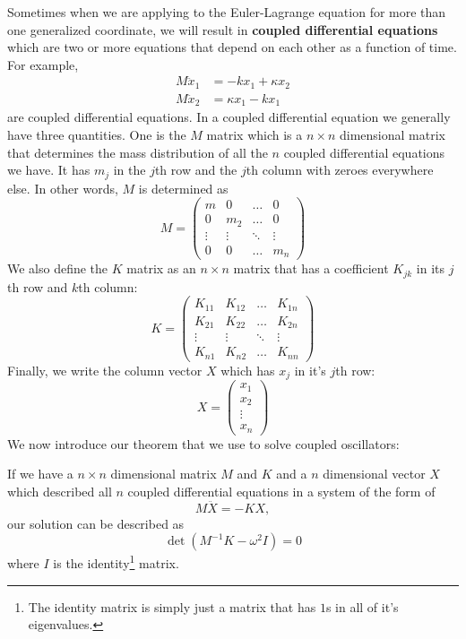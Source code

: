 \documentclass[11pt]{scrartcl}
\begin{document}
Sometimes when we are applying to the Euler-Lagrange equation for more than one generalized coordinate, we will result in \textbf{coupled differential equations} which are two or more equations that depend on each other as a function of time. For example, 
\begin{align*}
    M\ddot{x}_1 &= -kx_1 + \kappa x_2 \\
    M\ddot{x}_2 &= \kappa x_1 - kx_1
\end{align*}
are coupled differential equations. In a coupled differential equation we generally have three quantities. One is the $M$ matrix which is a $n\times n$ dimensional matrix that determines the mass distribution of all the $n$ coupled differential equations we have. It has $m_j$ in the $j$th row and the $j$th column with zeroes everywhere else. In other words, $M$ is determined as 
\[M = \begin{pmatrix}
m & 0 & \dots & 0 \\
0 & m_2 & \dots & 0 \\
\vdots & \vdots & \ddots & \vdots \\
0 & 0 & \dots & m_n
\end{pmatrix}\]
We also define the $K$ matrix as an $n\times n$ matrix that has a coefficient $K_{jk}$ in its $j$th row and $k$th column:
\[K = \begin{pmatrix}
K_{11} & K_{12} & \dots & K_{1n} \\
K_{21} & K_{22} & \dots & K_{2n} \\
\vdots & \vdots & \ddots & \vdots \\
K_{n1} & K_{n2} & \dots & K_{nn}
\end{pmatrix}\]
Finally, we write the column vector $X$ which has $x_j$ in it's $j$th row:
\[X = \begin{pmatrix}
x_1 \\
x_2 \\
\vdots \\
x_n
\end{pmatrix}\]
We now introduce our theorem that we use to solve coupled oscillators:
\begin{theorem}
If we have a $n\times n$ dimensional matrix $M$ and $K$ and a $n$ dimensional vector $X$ which described all $n$ coupled differential equations in a system of the form of 
\[M\ddot{X} = -KX,\]
our solution can be described as 
\[\det (M^{-1} K - \omega^2 I) = 0\]
where $I$ is the identity\footnote{The identity matrix is simply just a matrix that has $1$s in all of it's eigenvalues.} matrix.
\end{theorem}
\end{document}
